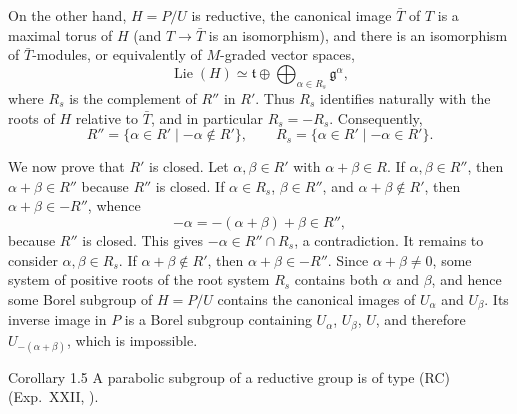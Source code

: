 On the other hand, \(H=P/U\) is reductive, the canonical image \(\bar T\)
of \(T\) is a maximal torus of \(H\) (and \(T\to\bar T\) is an
isomorphism), and there is an isomorphism of \(\bar T\)-modules, or
equivalently of \(M\)-graded vector spaces,
\[
 \operatorname{Lie}(H)\simeq\mathfrak t\oplus
 \bigoplus_{\alpha\in R_s}\mathfrak g^\alpha,
\]
where \(R_s\) is the complement of \(R''\) in \(R'\).  Thus \(R_s\)
identifies naturally with the roots of \(H\) relative to \(\bar T\), and in
particular \(R_s=-R_s\).  Consequently,
\[
 R''=\{\alpha\in R'\mid-\alpha\notin R'\},
 \qquad
 R_s=\{\alpha\in R'\mid-\alpha\in R'\}.
\]

We now prove that \(R'\) is closed.  Let \(\alpha,\beta\in R'\) with
\(\alpha+\beta\in R\).  If \(\alpha,\beta\in R''\), then
\(\alpha+\beta\in R''\) because \(R''\) is closed.  If
\(\alpha\in R_s\), \(\beta\in R''\), and \(\alpha+\beta\notin R'\), then
\(\alpha+\beta\in-R''\), whence
\[
 -\alpha=-(\alpha+\beta)+\beta\in R'',
\]
because \(R''\) is closed.  This gives
\(-\alpha\in R''\cap R_s\), a contradiction.  It remains to consider
\(\alpha,\beta\in R_s\).  If \(\alpha+\beta\notin R'\), then
\(\alpha+\beta\in-R''\).  Since \(\alpha+\beta\ne0\), some system of
positive roots of the root system \(R_s\) contains both \(\alpha\) and
\(\beta\), and hence some Borel subgroup of \(H=P/U\) contains the canonical
images of \(U_\alpha\) and \(U_\beta\).  Its inverse image in \(P\) is a
Borel subgroup containing \(U_\alpha\), \(U_\beta\), \(U\), and therefore
\(U_{-(\alpha+\beta)}\), which is impossible.

\begin{sgastatement}{Corollary 1.5}
A parabolic subgroup of a reductive group is of type \textup{(RC)}
\textup{(Exp.\ XXII, )}.
\end{sgastatement}

